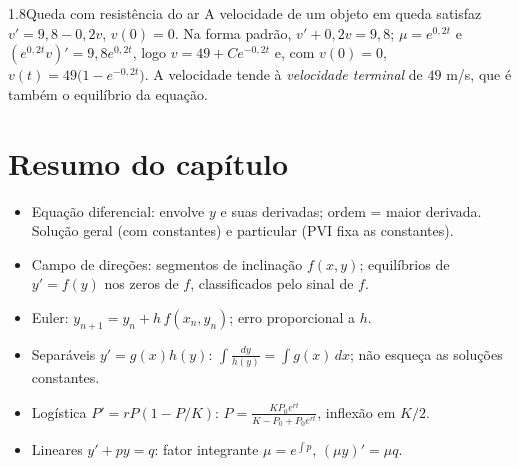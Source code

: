 \begin{exemplo}{1.8}{Queda com resistência do ar}
A velocidade de um objeto em queda satisfaz $v'=9{,}8-0{,}2v$, $v(0)=0$. Na forma padrão,
$v'+0{,}2v=9{,}8$; $\mu=e^{0{,}2t}$ e $(e^{0{,}2t}v)'=9{,}8e^{0{,}2t}$, logo
$v=49+Ce^{-0{,}2t}$ e, com $v(0)=0$, $v(t)=49\big(1-e^{-0{,}2t}\big)$. A velocidade tende à
\emph{velocidade terminal} de $49$ m/s, que é também o equilíbrio da equação.
\end{exemplo}

\section*{Resumo do capítulo}
\begin{itemize}
\item Equação diferencial: envolve $y$ e suas derivadas; ordem = maior derivada. Solução geral
  (com constantes) e particular (PVI fixa as constantes).
\item Campo de direções: segmentos de inclinação $f(x,y)$; equilíbrios de $y'=f(y)$ nos zeros
  de $f$, classificados pelo sinal de $f$.
\item Euler: $y_{n+1}=y_n+h\,f(x_n,y_n)$; erro proporcional a $h$.
\item Separáveis $y'=g(x)h(y)$: $\int\frac{dy}{h(y)}=\int g(x)\,dx$; não esqueça as soluções
  constantes.
\item Logística $P'=rP(1-P/K)$: $P=\frac{KP_0e^{rt}}{K-P_0+P_0e^{rt}}$, inflexão em $K/2$.
\item Lineares $y'+py=q$: fator integrante $\mu=e^{\int p}$, $(\mu y)'=\mu q$.
\end{itemize}


